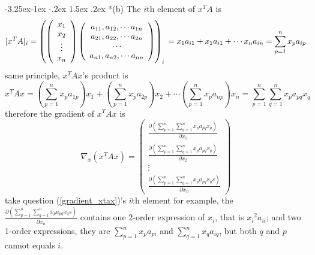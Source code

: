 \documentclass[12pt]{article}
\makeatletter
\renewcommand\subsection{\@startsection{subsection}{2}{\z@}%
	{-3.25ex\@plus -1ex \@minus -.2ex}%
	{1.5ex \@plus .2ex}%
	{\normalfont\large\bfseries}}%
\makeatother
\begin{document}
	\subsection*{(b)}
	The $i$th element of $x^TA$ is
	\begin{equation}\label{xt_a}
	[x^TA]_{i}=
	\left( 
	\left(  
	\begin{array}{c}  
	x_1 \\
	x_2 \\
	\vdots \\
	x_n 
	\end{array}
	\right)
	\left(  
	\begin{array}{c}  
	a_{11}, a_{12},\cdots a_{1n} \\
	a_{21}, a_{22},\cdots a_{2n} \\
	\cdots \\
	a_{n1}, a_{n2},\cdots a_{nn} \\
	\end{array}  
	\right)  
	\right)_{i}\\
	=x_1a_{i1} + x_1a_{i1} + \cdots x_na_{in}
	=\sum_{p=1}^n x_pa_{ip} 
	\end{equation}
	same principle, $x^TAx$'s product is
	\begin{equation}\label{xt_a_x}
	x^TAx = (\sum_{p=1}^n x_pa_{1p})x_1 + (\sum_{p=1}^n x_pa_{2p})x_2 + \cdots (\sum_{p=1}^n x_pa_{np})x_n
	= \sum_{p=1}^n \sum_{q=1}^n x_pa_{pq}x_q
	\end{equation}
	therefore the gradient of $x^TAx$ is
	\begin{equation}\label{gradient_xtax}
	\nabla_x(x^TAx)=
	\left(  
	\begin{array}{c}  
	\frac{\partial(\sum_{p=1}^n \sum_{q=1}^n x_pa_{pq}x_q)}{\partial x_1} \\
	\frac{\partial(\sum_{p=1}^n \sum_{q=1}^n x_pa_{pq}x_q)}{\partial x_2} \\
	\vdots \\
	\frac{\partial(\sum_{p=1}^n \sum_{q=1}^n x_pa_{pq}x_qs)}{\partial x_n} 
	\end{array}
	\right)
	\end{equation}
	take question (\ref{gradient_xtax})'s $i$th element for example, the $\frac{\partial(\sum_{p=1}^n \sum_{q=1}^n x_pa_{pq}x_qs)}{\partial x_n}$ contains one 2-order expression of $x_i$, that is ${x_i}^2a_{ii}$; and two 1-order expressions, they are $\sum_{p=1}^n x_pa_{pi}$ and $\sum_{q=1}^n x_qa_{iq}$, but both $q$ and $p$ cannot equals $i$.
\end{document}
